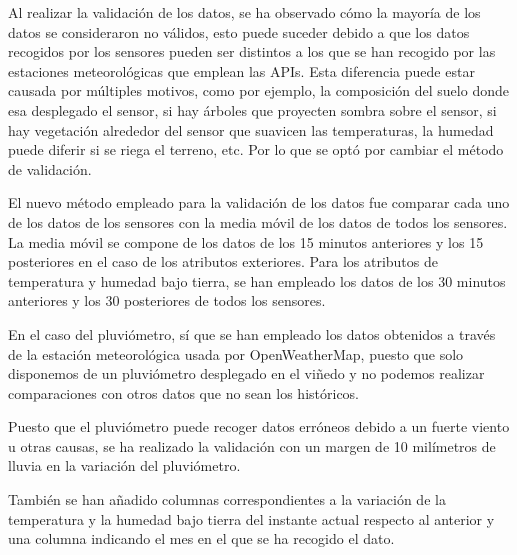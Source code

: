 \par

Al realizar la validación de los datos, se ha observado cómo la mayoría de los datos se consideraron no válidos, esto puede suceder debido a que los datos recogidos por los sensores pueden ser distintos a los que se han recogido por las estaciones meteorológicas que emplean las APIs. Esta diferencia puede estar causada por múltiples motivos, como por ejemplo, la composición del suelo donde esa desplegado el sensor, si hay árboles que proyecten sombra sobre el sensor, si hay vegetación alrededor del sensor que suavicen las temperaturas, la humedad puede diferir si se riega el terreno, etc. Por lo que se optó por cambiar el método de validación.

\par

El nuevo método empleado para la validación de los datos fue comparar cada uno de los datos de los sensores con la media móvil de los datos de todos los sensores. La media móvil se compone de los datos de los 15 minutos anteriores y los 15 posteriores en el caso de los atributos exteriores. Para los atributos de temperatura y humedad bajo tierra, se han empleado los datos de los 30 minutos anteriores y los 30 posteriores de todos los sensores.


\par

En el caso del pluviómetro, sí que se han empleado los datos obtenidos a través de la estación meteorológica usada por OpenWeatherMap, puesto que solo disponemos de un pluviómetro desplegado en el viñedo y no podemos realizar comparaciones con otros datos que no sean los históricos.

\par

Puesto que el pluviómetro puede recoger datos erróneos debido a un fuerte viento u otras causas, se ha realizado la validación con un margen de 10 milímetros de lluvia en la variación del pluviómetro.


\par

También se han añadido columnas correspondientes a la variación de la temperatura y la humedad bajo tierra del instante actual respecto al anterior y una columna indicando el mes en el que se ha recogido el dato.

